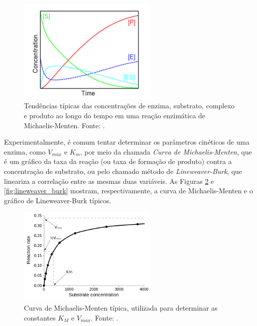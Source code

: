 \documentclass[12pt,oneside]{report}
\begin{document}
\begin{figure}[H]
    \centering
    \includegraphics[width=0.6\textwidth]{img/conc_time.png}
    \caption{\small Tendências típicas das concentrações de enzima, substrato, complexo e produto ao longo do tempo em uma reação enzimática de Michaelis-Menten. Fonte: .}
    \label{fig:concentracoes_michaelis_menten}
\end{figure}

Experimentalmente, é comum tentar determinar os parâmetros cinéticos de uma enzima, como $V_{max}$ e $K_m$, por meio da chamada \textit{Curva de Michaelis-Menten}, que é um gráfico da taxa da reação (ou taxa de formação de produto) contra a concentração de substrato, ou pelo chamado método de \textit{Lineweaver-Burk}, que lineariza a correlação entre as mesmas duas variáveis. As Figuras \ref{fig:MM_plot} e \ref{fig:lineweaver_burk} mostram, respectivamente, a curva de Michaelis-Menten e o gráfico de Lineweaver-Burk típicos.

\begin{figure}[H]
    \centering
    \includegraphics[width=0.6\textwidth]{img/Vmax_Km.png}
    \caption{\small Curva de Michaelis-Menten típica, utilizada para determinar as constantes $K_M$ e $V_{max}$. Fonte: .}
    \label{fig:MM_plot}
\end{figure}
\end{document}
